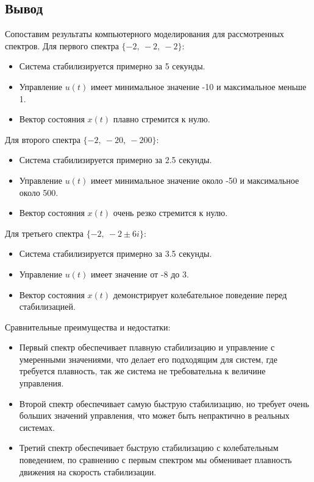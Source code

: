 \subsection{Вывод}

Сопоставим результаты компьютерного моделирования для рассмотренных спектров.
Для первого спектра $\{-2,\ -2,\ -2\}$:
\begin{itemize}
    \item Система стабилизируется примерно за 5 секунды.
    \item Управление $u(t)$ имеет минимальное значение -10 и максимальное меньше 1.
    \item Вектор состояния $x(t)$ плавно стремится к нулю.
\end{itemize}
Для второго спектра $\{-2,\ -20,\ -200\}$:
\begin{itemize}
    \item Система стабилизируется примерно за 2.5 секунды.
    \item Управление $u(t)$ имеет минимальное значение около -50 и максимальное около 500.
    \item Вектор состояния $x(t)$ очень резко стремится к нулю.
\end{itemize}
Для третьего спектра $\{-2,\ -2\pm 6i\}$:
\begin{itemize}
    \item Система стабилизируется примерно за 3.5 секунды.
    \item Управление $u(t)$ имеет значение от -8 до 3.
    \item Вектор состояния $x(t)$ демонстрирует колебательное поведение перед стабилизацией.
\end{itemize}
Сравнительные преимущества и недостатки:
\begin{itemize}
    \item Первый спектр обеспечивает плавную стабилизацию и управление 
    с умеренными значениями, что делает его подходящим для систем, где требуется
    плавность, так же система не требовательна к величине управления.
    \item Второй спектр обеспечивает самую быструю стабилизацию, но требует очень 
    больших значений управления, что может быть непрактично в реальных системах.
    \item Третий спектр обеспечивает быструю стабилизацию с колебательным поведением, 
    по сравнению с первым спектром мы обменивает плавность движения на скорость стабилизации.
\end{itemize}



